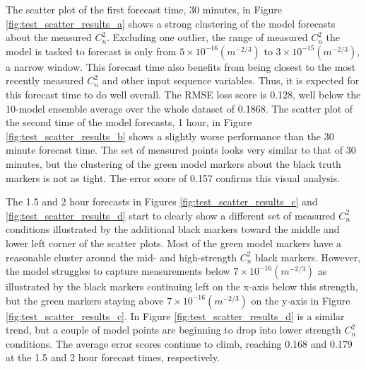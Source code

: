 The scatter plot of the first forecast time, 30 minutes, in Figure \ref{fig:test_scatter_results_a} shows a strong clustering of the model forecasts about the measured $C_{n}^{2}$. Excluding one outlier, the range of measured $C_{n}^{2}$ the model is tasked to forecast is only from $5 \times 10^{-16} (m^{-2/3})$ to $3 \times 10^{-15} (m^{-2/3})$, a narrow window. This forecast time also benefits from being closest to the most recently measured $C_{n}^{2}$ and other input sequence variables. Thus, it is expected for this forecast time to do well overall. The RMSE loss score is 0.128, well below the 10-model ensemble average over the whole dataset of 0.1868. The scatter plot of the second time of the model forecasts, 1 hour, in Figure \ref{fig:test_scatter_results_b} shows a slightly worse performance than the 30 minute forecast time. The set of measured points looks very similar to that of 30 minutes, but the clustering of the green model markers about the black truth markers is not as tight. The error score of 0.157 confirms this visual analysis.

The 1.5 and 2 hour forecasts in Figures \ref{fig:test_scatter_results_c} and \ref{fig:test_scatter_results_d} start to clearly show a different set of measured $C_{n}^{2}$ conditions illustrated by the additional black markers toward the middle and lower left corner of the scatter plots. Most of the green model markers have a reasonable cluster around the mid- and high-strength $C_{n}^{2}$ black markers. However, the model struggles to capture measurements below $7 \times 10^{-16} (m^{-2/3})$ as illustrated by the black markers continuing left on the x-axis below this strength, but the green markers staying above $7 \times 10^{-16} (m^{-2/3})$ on the y-axis in Figure \ref{fig:test_scatter_results_c}. In Figure \ref{fig:test_scatter_results_d} is a similar trend, but a couple of model points are beginning to drop into lower strength $C_{n}^{2}$ conditions. The average error scores continue to climb, reaching 0.168 and 0.179 at the 1.5 and 2 hour forecast times, respectively.

